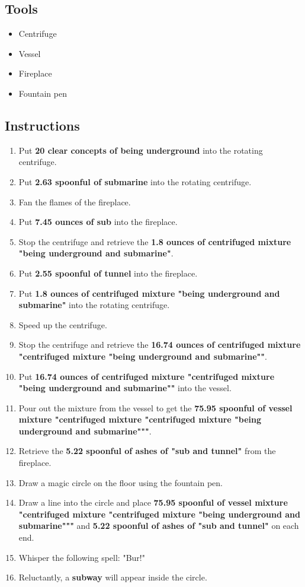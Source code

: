 \documentclass{article}
\begin{document}
\subsection{Tools}\begin{itemize}
\item 
Centrifuge
\item 
Vessel
\item 
Fireplace
\item 
Fountain pen
\end{itemize}
\subsection{Instructions}\begin{enumerate}
\item 
Put \textbf{20 clear concepts of being underground} into the rotating centrifuge.
\item 
Put \textbf{2.63 spoonful of submarine} into the rotating centrifuge.
\item 
Fan the flames of the fireplace.
\item 
Put \textbf{7.45 ounces of sub} into the fireplace.
\item 
Stop the centrifuge and retrieve the \textbf{1.8 ounces of centrifuged mixture "being underground and submarine"}.
\item 
Put \textbf{2.55 spoonful of tunnel} into the fireplace.
\item 
Put \textbf{1.8 ounces of centrifuged mixture "being underground and submarine"} into the rotating centrifuge.
\item 
Speed up the centrifuge.
\item 
Stop the centrifuge and retrieve the \textbf{16.74 ounces of centrifuged mixture "centrifuged mixture "being underground and submarine""}.
\item 
Put \textbf{16.74 ounces of centrifuged mixture "centrifuged mixture "being underground and submarine""} into the vessel.
\item 
Pour out the mixture from the vessel to get the \textbf{75.95 spoonful of vessel mixture "centrifuged mixture "centrifuged mixture "being underground and submarine"""}.
\item 
Retrieve the \textbf{5.22 spoonful of ashes of "sub and tunnel"} from the fireplace.
\item 
Draw a magic circle on the floor using the fountain pen.
\item 
Draw a line into the circle and place \textbf{75.95 spoonful of vessel mixture "centrifuged mixture "centrifuged mixture "being underground and submarine"""} and \textbf{5.22 spoonful of ashes of "sub and tunnel"} on each end.
\item 
Whisper the following spell: "Bur!"
\item 
Reluctantly, a \textbf{subway} will appear inside the circle.
\end{enumerate}
\newpage
\end{document}

